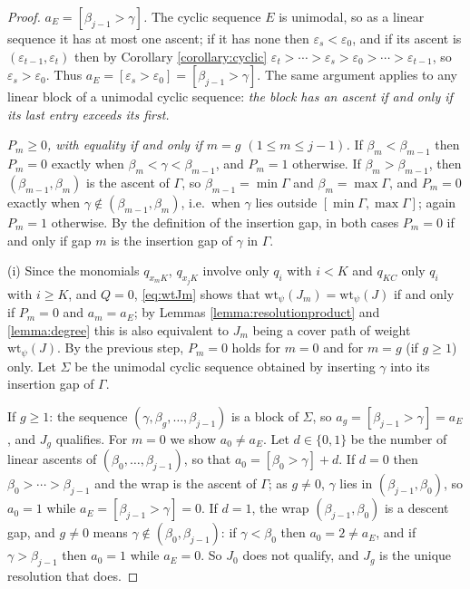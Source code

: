 \documentclass{amsart}
\theoremstyle{definition}
\theoremstyle{remark}
\numberwithin{equation}{section}
\begin{document}
\begin{proof}
\emph{$a_E=[\beta_{j-1}>\gamma]$.} The cyclic sequence $E$ is unimodal, so as a linear sequence it has at most one ascent; if it has none then $\varepsilon_s<\varepsilon_0$, and if its ascent is $(\varepsilon_{t-1},\varepsilon_t)$ then by Corollary \ref{corollary:cyclic} $\varepsilon_t>\cdots>\varepsilon_s>\varepsilon_0>\cdots>\varepsilon_{t-1}$, so $\varepsilon_s>\varepsilon_0$. Thus $a_E=[\varepsilon_s>\varepsilon_0]=[\beta_{j-1}>\gamma]$. The same argument applies to any linear block of a unimodal cyclic sequence: \emph{the block has an ascent if and only if its last entry exceeds its first.}

\emph{$P_m\geq0$, with equality if and only if $m=g$ $(1\leq m\leq j-1)$.} If $\beta_m<\beta_{m-1}$ then $P_m=0$ exactly when $\beta_m<\gamma<\beta_{m-1}$, and $P_m=1$ otherwise. If $\beta_m>\beta_{m-1}$, then $(\beta_{m-1},\beta_m)$ is the ascent of $\Gamma$, so $\beta_{m-1}=\min\Gamma$ and $\beta_m=\max\Gamma$, and $P_m=0$ exactly when $\gamma\notin(\beta_{m-1},\beta_m)$, i.e.\ when $\gamma$ lies outside $[\min\Gamma,\max\Gamma]$; again $P_m=1$ otherwise. By the definition of the insertion gap, in both cases $P_m=0$ if and only if gap $m$ is the insertion gap of $\gamma$ in $\Gamma$.

(i) Since the monomials $q_{x_mK}$, $q_{x_jK}$ involve only $q_i$ with $i<K$ and $q_{KC}$ only $q_i$ with $i\geq K$, and $Q=0$, \eqref{eq:wtJm} shows that $\mathrm{wt}_\psi(J_m)=\mathrm{wt}_\psi(J)$ if and only if $P_m=0$ and $a_m=a_E$; by Lemmas \ref{lemma:resolutionproduct} and \ref{lemma:degree} this is also equivalent to $J_m$ being a cover path of weight $\mathrm{wt}_\psi(J)$. By the previous step, $P_m=0$ holds for $m=0$ and for $m=g$ (if $g\geq1$) only. Let $\Sigma$ be the unimodal cyclic sequence obtained by inserting $\gamma$ into its insertion gap of $\Gamma$.

If $g\geq1$: the sequence $(\gamma,\beta_g,\ldots,\beta_{j-1})$ is a block of $\Sigma$, so $a_g=[\beta_{j-1}>\gamma]=a_E$, and $J_g$ qualifies. For $m=0$ we show $a_0\neq a_E$. Let $d\in\{0,1\}$ be the number of linear ascents of $(\beta_0,\ldots,\beta_{j-1})$, so that $a_0=[\beta_0>\gamma]+d$. If $d=0$ then $\beta_0>\cdots>\beta_{j-1}$ and the wrap is the ascent of $\Gamma$; as $g\neq0$, $\gamma$ lies in $(\beta_{j-1},\beta_0)$, so $a_0=1$ while $a_E=[\beta_{j-1}>\gamma]=0$. If $d=1$, the wrap $(\beta_{j-1},\beta_0)$ is a descent gap, and $g\neq0$ means $\gamma\notin(\beta_0,\beta_{j-1})$: if $\gamma<\beta_0$ then $a_0=2\neq a_E$, and if $\gamma>\beta_{j-1}$ then $a_0=1$ while $a_E=0$. So $J_0$ does not qualify, and $J_g$ is the unique resolution that does.


\end{proof}
\end{document}
